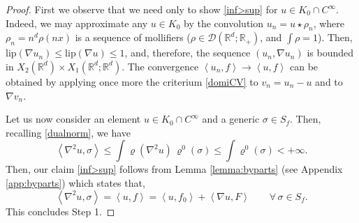 \documentclass[11pt,letterpaper,reqno]{amsart}
\theoremstyle{definition}
\numberwithin{equation}{section}
\newcommand{\R}{\mathbb{R}}
\newcommand{\Rd}{\R^d}
\newcommand{\pairing}[1]{{\left \langle #1 \right \rangle}}
\newcommand{\Lip}{{\mathrm{lip}}}
\newcommand{\D}{\mathcal{D}}
\newcommand{\Sf}{{{S}_f}}
\begin{document}
\begin{proof}
 First we observe that we need only to show \eqref{inf>sup} for $u\in K_0\cap C^\infty$. Indeed, we may approximate any $u\in K_0$
 by the convolution $u_n= u\star \rho_n$, where  $\rho_n= n^d \rho(nx)$ is a sequence of mollifiers ($\rho\in \D(\R^d;\R_+)$, and $\int \rho=1$).
 Then, $\Lip(\nabla u_n) \le  \Lip(\nabla u) \le 1$, and, therefore, the sequence $(u_n,\nabla u_n)$ is bounded in $X_2(\R^d)\times X_1(\R^d;\Rd)$. The convergence $\pairing{u_n,f}\to \pairing{u,f}$ can be obtained
 by applying once more the criterium \eqref{domiCV} to $v_n=u_n-u$ and to $\nabla v_n$. 
 
 Let us now consider an element $u\in K_0 \cap C^\infty$ and a generic $\sigma\in \Sf$. Then, recalling \eqref{dualnorm}, we have
 $$ { \pairing {\nabla^2 u, \sigma} } \le  \int \varrho(\nabla^2u)  \, \varrho^0(\sigma) \le   \int \varrho^0(\sigma) <+\infty.$$
 Then, our claim \eqref{inf>sup} follows from Lemma \ref{lemma:byparts} (see Appendix \ref{app:byparts}) which states that,
\begin{equation}\label{byparts}
 {\pairing {\nabla^2 u, \sigma}}  =   \pairing{u,f}  =\pairing{u,f_0} + \pairing{\nabla u, F} \qquad  \forall \, \sigma\in \Sf .
 \end{equation}
This concludes Step 1.





\end{proof}
\end{document}
